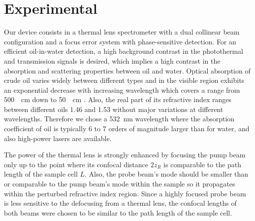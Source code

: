\documentclass[9pt,twocolumn,twoside]{osajnl}
\begin{document}
\section{Experimental}
\label{Experimental}

Our device consists in a thermal lens spectrometer with a dual collinear beam configuration and a focus error system with phase-sensitive detection. For an efficient oil-in-water detection, a high background contrast in the photothermal and transmission signals is desired, which implies a high contrast in the absorption and scattering properties between oil and water. Optical absorption of crude oil varies widely between different types and in the visible region exhibits an exponential decrease with increasing wavelength which covers a range from \SI{500}{\per\centi\metre} down to \SI{50}{\per\centi\metre} \cite{OilCatalogue2005}. Also, the real part of its refractive index ranges between different oils \SI{1.46}{} and \SI{1.53}{} \cite{Otremba2000} without major variations at different wavelengths. Therefore we chose a \SI{532}{\nano\metre} wavelength where the absorption coefficient of oil is typically \SI{6}{} to \SI{7}{} orders of magnitude larger than for water, and also high-power lasers are available.

The power of the thermal lens is strongly enhanced by focusing the pump beam only up to the point where its confocal distance $2 z_R$ is comparable to the path length of the sample cell $L$. Also, the probe beam's mode should be smaller than or comparable to the pump beam's mode within the sample so it propagates within the perturbed refractive index region. Since a highly focused probe beam is less sensitive to the defocusing from a thermal lens, the confocal lengths of both beams were chosen to be similar to the path length of the sample cell. \\

\end{document}
